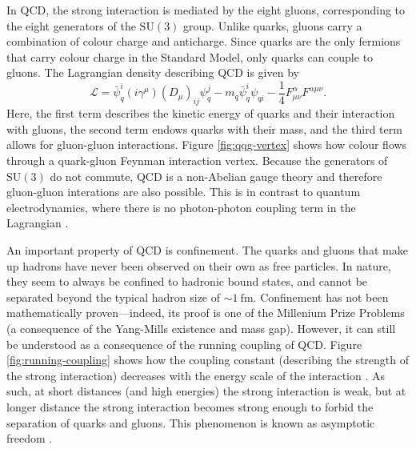 \documentclass[12pt,a4paper]{report}
\begin{document}
In QCD, the strong interaction is mediated by the eight gluons, corresponding to the eight generators of the $\text{SU}(3)$ group. Unlike quarks, gluons carry a combination of colour charge and anticharge. Since quarks are the only fermions that carry colour charge in the Standard Model, only quarks can couple to gluons. The Lagrangian density describing QCD is given by
\begin{equation}
  \mathcal{L} = \bar{\psi}_q^i (i \gamma^\mu) (D_\mu)_{ij} \psi_q^j - m_q \bar{\psi}^i_q \psi_{qi} - \frac{1}{4} F_{\mu\nu}^\alpha F^{\alpha\mu\nu}.
\end{equation}
Here, the first term describes the kinetic energy of quarks and their interaction with gluons, the second term endows quarks with their mass, and the third term allows for gluon-gluon interactions. Figure \ref{fig:qqg-vertex} shows how colour flows through a quark-gluon Feynman interaction vertex. Because the generators of $\text{SU}(3)$ do not commute, QCD is a non-Abelian gauge theory and therefore gluon-gluon interations are also possible. This is in contrast to quantum electrodynamics, where there is no photon-photon coupling term in the Lagrangian \cite{Thomson:2013zua,Ellis:1996mzs,ParticleDataGroup:2024cfk}.

An important property of QCD is confinement. The quarks and gluons that make up hadrons have never been observed on their own as free particles. In nature, they seem to always be confined to hadronic bound states, and cannot be separated beyond the typical hadron size of $\sim \qty{1}{\femto\meter}$. Confinement has not been mathematically proven---indeed, its proof is one of the Millenium Prize Problems (a consequence of the Yang-Mills existence and mass gap). However, it can still be understood as a consequence of the running coupling of QCD. Figure \ref{fig:running-coupling} shows how the coupling constant (describing the strength of the strong interaction) decreases with the energy scale of the interaction \cite{ParticleDataGroup:2024cfk}. As such, at short distances (and high energies) the strong interaction is weak, but at longer distance the strong interaction becomes strong enough to forbid the separation of quarks and gluons. This phenomenon is known as asymptotic freedom \cite{Gross:1973ju,Politzer:1974fr}.
\end{document}
